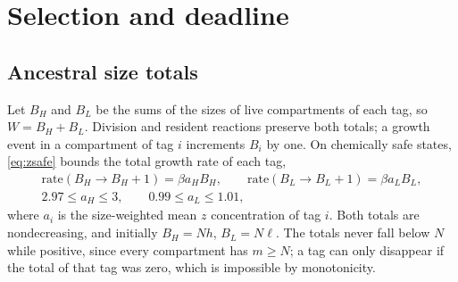 \documentclass[11pt,a4paper]{article}
\theoremstyle{plain}
\theoremstyle{definition}
\theoremstyle{remark}
\begin{document}
\section{Selection and deadline}\label{sec:selection}

\subsection{Ancestral size totals}
Let $B_H$ and $B_L$ be the sums of the sizes of live compartments of each tag, so $W=B_H+B_L$. Division and resident reactions preserve both totals; a growth event in a compartment of tag $i$ increments $B_i$ by one. On chemically safe states, \eqref{eq:zsafe} bounds the total growth rate of each tag,
\begin{equation}\label{eq:aggregate}
\begin{gathered}
\text{rate}(B_H\to B_H+1)=\beta a_HB_H,\qquad \text{rate}(B_L\to B_L+1)=\beta a_LB_L,\\
2.97\leq a_H\leq3,\qquad 0.99\leq a_L\leq1.01,
\end{gathered}
\end{equation}
where $a_i$ is the size-weighted mean $z$ concentration of tag $i$. Both totals are nondecreasing, and initially $B_H=Nh$, $B_L=N\ell$. The totals never fall below $N$ while positive, since every compartment has $m\geq N$; a tag can only disappear if the total of that tag was zero, which is impossible by monotonicity.
\end{document}
